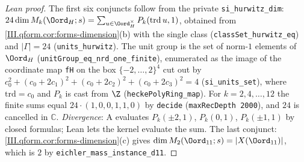 \begin{proof}[Lean proof]
The first six conjuncts follow from the private \texttt{si\_hurwitz\_dim}: $24\dim M_k(\Oord_H;s)=\sum_{u\in\Oord_H^\times}P_k(\mathrm{trd}\,u,1)$, obtained from \cref{III.qform.cor:forms-dimension}(b) with the single class (\texttt{classSet\_hurwitz\_eq}) and $|\Gamma|=24$ (\texttt{units\_hurwitz}). The unit group is the set of norm-$1$ elements of $\Oord_H$ (\texttt{unitGroup\_eq\_nrd\_one\_finite}), enumerated as the image of the coordinate map \texttt{fH} on the box $\{-2,\dots,2\}^4$ cut out by $c_0^2+(c_0+2c_1)^2+(c_0+2c_2)^2+(c_0+2c_3)^2=4$ (\texttt{si\_units\_set}), where $\mathrm{trd}=c_0$ and $P_k$ is cast from $\Z$ (\texttt{heckePolyRing\_map}). For $k=2,4,\dots,12$ the finite sums equal $24\cdot(1,0,0,1,1,0)$ by \texttt{decide} (\texttt{maxRecDepth 2000}), and $24$ is cancelled in $\mathbb C$. \emph{Divergence}: A evaluates $P_k(\pm2,1)$, $P_k(0,1)$, $P_k(\pm1,1)$ by closed formulas; Lean lets the kernel evaluate the sum. The last conjunct: \cref{III.qform.cor:forms-dimension}(c) gives $\dim M_2(\Oord_{11};s)=|X(\Oord_{11})|$, which is $2$ by \texttt{eichler\_mass\_instance\_d11}.
\end{proof}


